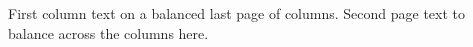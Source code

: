 \documentclass[twocolumn]{article}
\begin{document}
First column text on a balanced last page of columns.
\newpage
Second page text to balance across the columns here.
\end{document}
